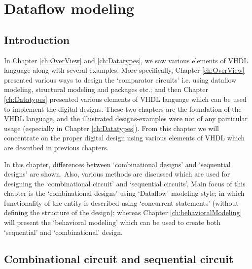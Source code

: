 \chapter{Dataflow modeling} \label{ch:dataflowModeling}

\graphicspath{{Chapters/Dataflow/Figures/}}


%

\section{Introduction}
In Chapter \ref{ch:OverView} and \ref{ch:Datatypes}, we saw various elements of VHDL language along with several examples. More specifically, Chapter \ref{ch:OverView} presented various ways to design the `comparator circuits' i.e. using dataflow modeling, structural modeling and packages etc.; and then Chapter \ref{ch:Datatypes} presented various elements of VHDL language which can be used to implement the digital designs. These two chapters are the foundation of the VHDL language, and the illustrated designs-examples were not of any particular usage (especially in Chapter \ref{ch:Datatypes}). From this chapter we will concentrate on the proper digital design using various elements of VHDL which are described in previous chapters.  

In this chapter, differences between `combinational designs' and `sequential designs' are shown. Also, various methods are discussed which are used for designing the `combinational circuit' and `sequential circuits'. Main focus of this chapter is the `combinational designs' using `Dataflow' modeling style; in which functionality of the entity is described using `concurrent statements' (without defining the structure of the design); whereas Chapter \ref{ch:behavioralModeling} will present the `behavioral modeling' which can be used to create both `sequential' and `combinational' design. 

\section{Combinational circuit and sequential circuit}\label{sec:combSeqCircuit}

